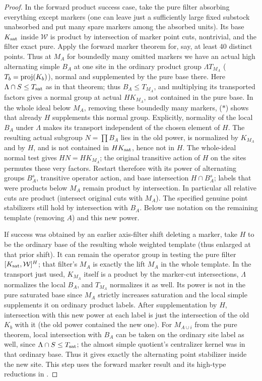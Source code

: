 \begin{proof}
In the forward product success case, take the pure filter absorbing everything except markers (one
can leave just a sufficiently large fixed substock unabsorbed and put many spare markers among the
absorbed units). Its base \(K_{\rm sat}\) inside \(\mathcal W\) is product by intersection of
marker point cuts, nontrivial, and the filter exact pure. Apply the forward marker theorem for,
say, at least 40 distinct points. Thus at \(M_A\) for boundedly many omitted markers we have an
actual high alternating simple \(B_A\) at one site in the ordinary product group \(\Lambda
T_{M_A}\) (\(T_b={\rm proj}(K_b)\)), normal and supplemented by the pure base there. Here
\(\Lambda\cap S\le T_{\rm sat}\) as in that theorem; thus \(B_A\le T_{M_A}\), and multiplying its
transported factors gives a normal group at actual \(HK_{M_A}\), not contained in the pure base.
In the whole ideal below \(M_A\), removing these boundedly many markers, (\(*\)) shows that
already \(H\) supplements this normal group.  Explicitly, normality of
the local \(B_A\) under \(\Lambda\) makes its transport independent of
the chosen element of \(H\).  The resulting actual subgroup
\(N=\prod B_A\) lies in the old power, is normalized by
\(K_{M_A}\) and by \(H\), and is not contained in
\(HK_{\rm sat}\), hence not in \(H\).  The whole-ideal normal test
gives \(HN=HK_{M_A}\); the original transitive action of \(H\) on
the sites permutes these very factors.
Restart therefore with its power of alternating
groups \(B_A^s\), transitive operator action, and base intersection \(H\cap B_A^s\); labels that
were products below \(M_A\) remain product by intersection. In particular all relative cuts are
product (intersect original cuts with \(M_A\)). The specified genuine point stabilizers still hold
by intersection with \(B_A\). Below use notation on the remaining template (removing \(A\)) and
this new power.

If success was obtained by an earlier axis-filter shift deleting a marker, take \(H\) to be the
ordinary base of the resulting whole weighted template (thus enlarged at that prior shift). It can
remain the operator group in testing the pure filter \([K_{\rm sat},\mathcal W]^H\); that filter's
\(M_A\) is exactly the lift \(M_A\) in the whole template. In the transport just used, \(K_{M_A}\)
itself is a product by the marker-cut intersections, \(\Lambda\) normalizes the local \(B_A\), and
\(T_{M_A}\) normalizes it as well. Its power is not in the pure saturated base since \(M_A\)
strictly increases saturation and the local simple supplements it on ordinary product labels.
After supplementation by \(H\), intersection with this new power at each label is just the
intersection of the old \(K_b\) with it (the old power contained the new one). For \(M_{A\cup i}\)
from the pure theorem, local intersection with \(B_A\) can be taken on the ordinary site label as
well, since \(\Lambda\cap S\le T_{\rm sat}\); the almost simple quotient's centralizer kernel was
in that ordinary base. Thus it gives exactly the alternating point stabilizer inside the new site.
This step uses the forward marker result and its high-type reductions in
.
\end{proof}

